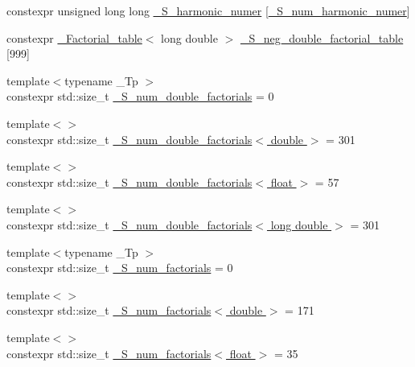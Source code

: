 \begin{DoxyCompactItemize}
\item 
constexpr unsigned long long \hyperlink{namespacestd_1_1____detail_a3976bb1731d7ecfaba4601d1083d7cf6}{\+\_\+\+S\+\_\+harmonic\+\_\+numer} \mbox{[}\hyperlink{namespacestd_1_1____detail_a554788747841f6abbfd7572673df32ad}{\+\_\+\+S\+\_\+num\+\_\+harmonic\+\_\+numer}\mbox{]}
\item 
constexpr \hyperlink{structstd_1_1____detail_1_1__Factorial__table}{\+\_\+\+Factorial\+\_\+table}$<$ long double $>$ \hyperlink{namespacestd_1_1____detail_adb3fbe0d6f7c40b02e479b63d547f57c}{\+\_\+\+S\+\_\+neg\+\_\+double\+\_\+factorial\+\_\+table} \mbox{[}999\mbox{]}
\item 
{\footnotesize template$<$typename \+\_\+\+Tp $>$ }\\constexpr std\+::size\+\_\+t \hyperlink{namespacestd_1_1____detail_a762f5ed905d1f926bfd8b16f8ea2c568}{\+\_\+\+S\+\_\+num\+\_\+double\+\_\+factorials} = 0
\item 
{\footnotesize template$<$$>$ }\\constexpr std\+::size\+\_\+t \hyperlink{namespacestd_1_1____detail_ae829eb6434a90060ee0650f1c71fb92d}{\+\_\+\+S\+\_\+num\+\_\+double\+\_\+factorials$<$ double $>$} = 301
\item 
{\footnotesize template$<$$>$ }\\constexpr std\+::size\+\_\+t \hyperlink{namespacestd_1_1____detail_ac55fdd5d901fcd9335503b16ec897444}{\+\_\+\+S\+\_\+num\+\_\+double\+\_\+factorials$<$ float $>$} = 57
\item 
{\footnotesize template$<$$>$ }\\constexpr std\+::size\+\_\+t \hyperlink{namespacestd_1_1____detail_a46272d8c219cfca2054da99471ed3711}{\+\_\+\+S\+\_\+num\+\_\+double\+\_\+factorials$<$ long double $>$} = 301
\item 
{\footnotesize template$<$typename \+\_\+\+Tp $>$ }\\constexpr std\+::size\+\_\+t \hyperlink{namespacestd_1_1____detail_a671f3ba94c1b06be87992486bca37426}{\+\_\+\+S\+\_\+num\+\_\+factorials} = 0
\item 
{\footnotesize template$<$$>$ }\\constexpr std\+::size\+\_\+t \hyperlink{namespacestd_1_1____detail_ad415b9ec36471d7aca4ebcd22cb7b216}{\+\_\+\+S\+\_\+num\+\_\+factorials$<$ double $>$} = 171
\item 
{\footnotesize template$<$$>$ }\\constexpr std\+::size\+\_\+t \hyperlink{namespacestd_1_1____detail_a3a29651303ca2222246ef6f0a17e92ec}{\+\_\+\+S\+\_\+num\+\_\+factorials$<$ float $>$} = 35

\end{DoxyCompactItemize}
